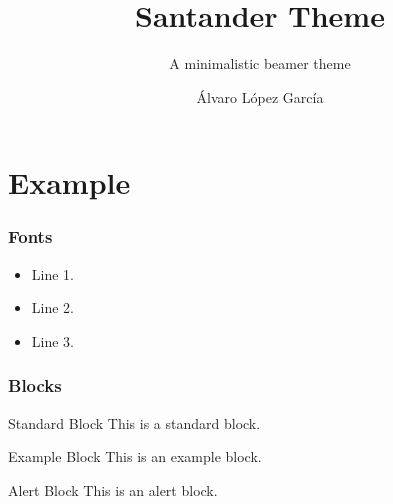 \documentclass[11 pt,t]{beamer}
\author{{\'A}lvaro L{\'o}pez Garc{\'i}a}
\title{Santander Theme}
\subtitle{A minimalistic beamer theme}
\institute{Center for minimalistic beamer themes}
\begin{document}
\frame{

\titlepage

}


\section{Example}


\begin{frame}
\frametitle{Fonts}

\begin{itemize}
    \item Line 1.
    \item<2-> Line 2.
    \item<3-> Line 3.
\end{itemize}


\end{frame}


\begin{frame}
\frametitle{Blocks}

\begin{block}{Standard Block}
    This is a standard block.
\end{block}

\begin{exampleblock}{Example Block}
    This is an example block.
\end{exampleblock}

\begin{alertblock}{Alert Block}
    This is an alert block.
\end{alertblock}



\end{frame}
\end{document}
